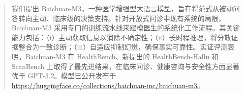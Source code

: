 \begin{abstract}
  我们提出 Baichuan-M3，一种医学增强型大语言模型，旨在将范式从被动问答转向主动、临床级的决策支持。针对开放式问诊中现有系统的局限，Baichuan-M3 采用专门的训练流水线来建模医生的系统化工作流程。其关键能力包括：（i）主动获取信息以消除不确定性；（ii）长时程推理，将分散证据整合为一致诊断；（iii）自适应抑制幻觉，确保事实可靠性。实证评测表明，Baichuan-M3 在 HealthBench、新提出的 HealthBench-Hallu 和 ScanBench 上取得了最先进结果，在临床问诊、健康咨询与安全性方面显著优于 GPT-5.2。模型已公开发布于 \href{https://huggingface.co/collections/baichuan-inc/baichuan-m3}{https://huggingface.co/collections/baichuan-inc/baichuan-m3}。  
\end{abstract}

